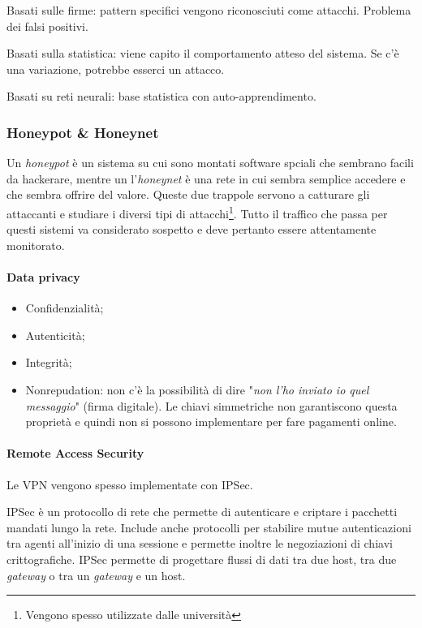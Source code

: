Basati sulle firme: pattern specifici vengono riconosciuti come attacchi.
Problema dei falsi positivi.

Basati sulla statistica: viene capito il comportamento atteso del sistema. Se
c'è una variazione, potrebbe esserci un attacco.

Basati su reti neurali: base statistica con auto-apprendimento.

\subsubsection{Honeypot \& Honeynet}

Un \textit{honeypot} è un sistema su cui sono montati software spciali
che sembrano facili da hackerare,
mentre un l'\textit{honeynet} è una rete in cui sembra semplice accedere
e che sembra offrire del valore.   
Queste due trappole servono a catturare gli attaccanti e studiare 
i diversi tipi di attacchi\footnote{Vengono spesso utilizzate dalle
università}. Tutto il traffico che passa per questi sistemi va considerato
sospetto e deve pertanto essere attentamente monitorato.

\paragraph{Data privacy}

\begin{itemize}
\item Confidenzialità;
\item Autenticità;
\item Integrità;
\item Nonrepudation: non c'è la possibilità di dire "\textit{non l'ho inviato io
quel messaggio}" (firma digitale). Le chiavi simmetriche non garantiscono questa
proprietà e quindi non si possono implementare per fare pagamenti online.
\end{itemize}

\paragraph{Remote Access Security}

Le VPN vengono spesso implementate con IPSec.

IPSec è un protocollo di rete che permette di autenticare e criptare i
pacchetti mandati lungo la rete. Include anche protocolli per stabilire mutue
autenticazioni tra agenti all'inizio di una sessione e permette inoltre le
negoziazioni di chiavi crittografiche. IPSec permette di progettare flussi di
dati tra due host, tra due \textit{gateway} o tra un \textit{gateway} e un
host.


